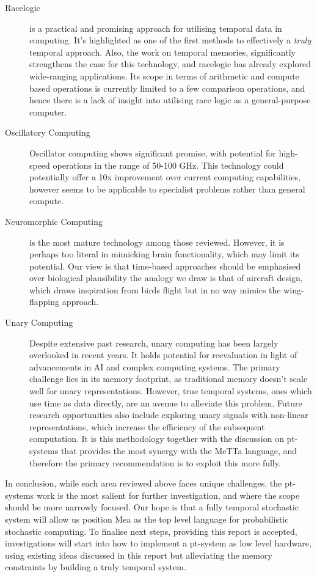 \documentclass{article}
\begin{document}
\begin{description}

	\item[Racelogic] is a practical and promising approach for utilising temporal data in computing. It's highlighted as one of the first methods to effectively a \textit{truly} temporal approach. Also, the work on temporal memories, significantly strengthens the case for this technology, and racelogic has already explored wide-ranging applications. Its scope in terms of arithmetic and compute based operations is currently limited to a few comparison operations, and hence there is a lack of insight into utilising race logic as a general-purpose computer.


	\item[Oscillatory Computing] Oscillator computing shows significant promise, with potential for high-speed operations in the range of 50-100 GHz. This technology could potentially offer a 10x improvement over current computing capabilities, however seems to be applicable to specialist problems rather than general compute.

	\item[Neuromorphic Computing] is the most mature technology among those reviewed. However, it is perhaps too literal in mimicking brain functionality, which may limit its potential. Our view is that time-based approaches should be emphasised over biological plausibility the analogy we draw is that of aircraft design, which draws inspiration from birds flight but in no way mimics the wing-flapping approach.


	\item[Unary Computing] Despite extensive past research, unary computing has been largely overlooked in recent years. It holds potential for reevaluation in light of advancements in AI and complex computing systems. The primary challenge lies in its memory footprint, as traditional memory doesn't scale well for unary representations. However, true temporal systems, ones which use time as data directly, are an avenue to alleviate this problem. Future research opportunities also include exploring unary signals with non-linear representations, which increase the efficiency of the subsequent computation. It is this methodology together with the discussion on pt-systems that provides the most synergy with the MeTTa language, and therefore the primary recommendation is to exploit this more fully.
\end{description}

In conclusion, while each area reviewed above faces unique challenges, the pt-systems work is the most salient for further investigation, and where the scope should be more narrowly focused. Our hope is that a fully temporal stochastic system will allow us position Mea as the  top level language for probabilistic stochastic computing. 
To finalise next steps, providing this report is accepted, investigations will start into how to implement a pt-system as low level hardware, using existing ideas discussed in this report but alleviating the memory constraints by building a truly temporal system.  




\end{document}
